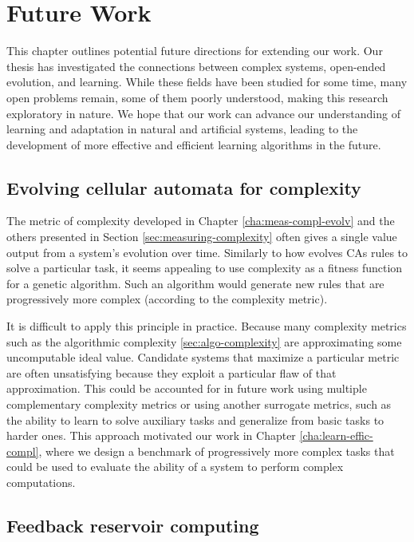 \chapter{Future Work}\label{cha:future_work}

This chapter outlines potential future directions for extending our work. Our 
thesis has investigated the connections between complex systems, open-ended 
evolution, and learning. While these fields have been studied for some time, 
many open problems remain, some of them poorly understood, making this research exploratory
in nature. We hope that our work can advance our understanding of learning and
adaptation in natural and artificial systems, leading to the development of more
effective and efficient learning algorithms in the future.

\section{Evolving cellular automata for complexity}

The metric of complexity developed in Chapter \ref{cha:meas-compl-evolv} and the
others presented in Section \ref{sec:measuring-complexity} often gives a single
value output from a system's evolution over time. Similarly to how
\textcite{mitchellEvolvingCellularAutomata1996} evolves \acp{CA} rules to solve
a particular task, it seems appealing to use complexity as a fitness
function for a genetic algorithm. Such an algorithm would generate new rules
that are progressively more complex (according to the complexity metric).

It is difficult to apply this principle in practice. Because many complexity 
metrics such as the algorithmic complexity \ref{sec:algo-complexity} are 
approximating some uncomputable ideal value. Candidate systems that maximize a 
particular metric are often unsatisfying because they exploit a particular flaw 
of that approximation. This could be accounted for in future
work using multiple complementary complexity metrics or using another surrogate
metrics, such as the ability to learn to solve auxiliary tasks and generalize 
from basic tasks to harder ones.
This approach motivated our work in Chapter \ref{cha:learn-effic-compl}, where
we design a benchmark of progressively more complex tasks that could be used to
evaluate the ability of a system to perform complex computations.

\section{Feedback reservoir computing}

